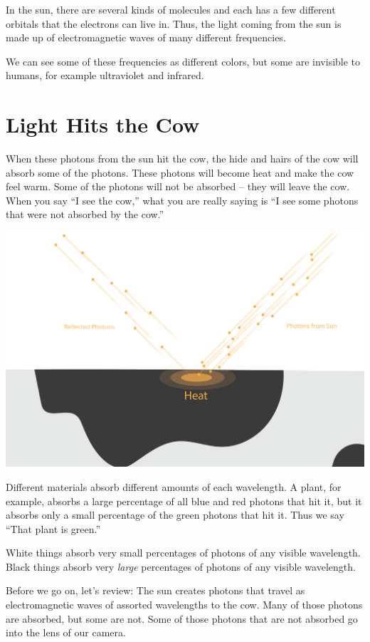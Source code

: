 In the sun, there are several kinds of molecules and each has a few
different orbitals that the electrons can live in.  Thus, the light
coming from the sun is made up of electromagnetic waves of many
different frequencies.

We can see some of these frequencies as different colors, but some are
invisible to humans, for example ultraviolet and infrared.

\section{Light Hits the Cow}


When these photons from the sun hit the cow, the hide and hairs of the
cow will absorb some of the photons. These photons will become heat
and make the cow feel warm.  Some of the photons will not be absorbed
-- they will leave the cow.  When you say ``I see the cow,'' what you are
really saying is ``I see some photons that were not absorbed by the cow.''

\includegraphics[width=1\textwidth]{cow4.png}


Different materials absorb different amounts of each wavelength. A
plant, for example, absorbs a large percentage of all blue and red
photons that hit it, but it absorbs only a small percentage of the
green photons that hit it.  Thus we say ``That plant is green.''

White things absorb very small percentages of photons of any visible
wavelength.  Black things absorb very \emph{large} percentages of
photons of any visible wavelength.

Before we go on, let's review: The sun creates photons that travel as
electromagnetic waves of assorted wavelengths to the cow.  Many of
those photons are absorbed, but some are not.  Some of those photons
that are not absorbed go into the lens of our camera.

